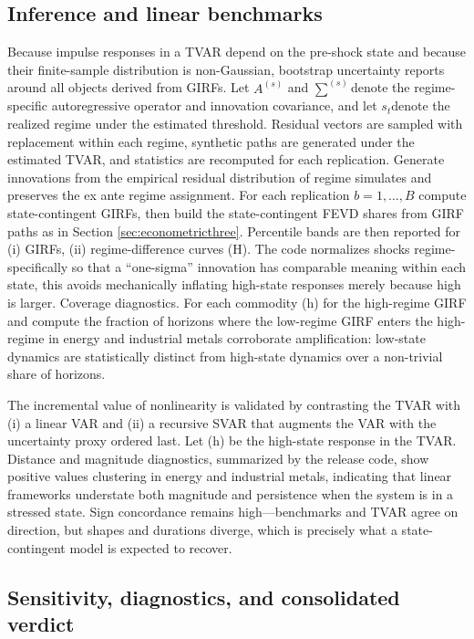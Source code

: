 \documentclass[
  11pt,
]{article}
\begin{document}
\subsection{Inference and linear benchmarks}\label{sec:validationone}

Because impulse responses in a TVAR depend on the pre-shock state and because their finite-sample distribution is non-Gaussian, bootstrap uncertainty reports around all objects derived from GIRFs.
Let \(A^{(s)}\) and \(\sum^{(s)}\)denote the regime-specific autoregressive operator and innovation covariance, and let \(s_t\)denote the realized regime under the estimated threshold. Residual vectors are sampled with replacement within each regime, synthetic paths are generated under the estimated TVAR, and statistics are recomputed for each replication.
Generate innovations from the empirical residual distribution of regime simulates and preserves the ex ante regime assignment. For each replication \(b=1,…,B\) compute state-contingent GIRFs, then build the state-contingent FEVD shares from GIRF paths as in Section \ref{sec:econometricthree}. Percentile bands are then reported for (i) GIRFs, (ii) regime-difference curves (H). The code normalizes shocks regime-specifically so that a ``one-sigma'' innovation has comparable meaning within each state, this avoids mechanically inflating high-state responses merely because high is larger. Coverage diagnostics. For each commodity (h) for the high-regime GIRF and compute the fraction of horizons where the low-regime GIRF enters the high-regime in energy and industrial metals corroborate amplification: low-state dynamics are statistically distinct from high-state dynamics over a non-trivial share of horizons.

The incremental value of nonlinearity is validated by contrasting the TVAR with (i) a linear VAR and (ii) a recursive SVAR that augments the VAR with the uncertainty proxy ordered last. Let (h) be the high-state response in the TVAR. Distance and magnitude diagnostics, summarized by the release code, show positive values clustering in energy and industrial metals, indicating that linear frameworks understate both magnitude and persistence when the system is in a stressed state. Sign concordance remains high---benchmarks and TVAR agree on direction, but shapes and durations diverge, which is precisely what a state-contingent model is expected to recover.

\subsection{Sensitivity, diagnostics, and consolidated verdict}\label{sec:validationtwo}
\end{document}

